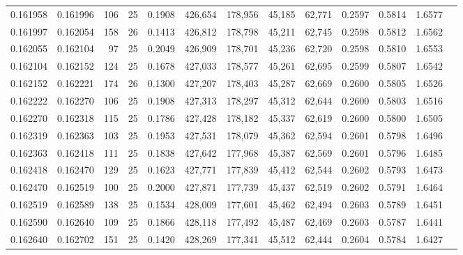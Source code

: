 \begin{tabular}{rrrrrrrrrrrrr}
0.161958 & 0.161996 &   106 &  25 &                                     0.1908 & 426,654 & 178,956 &  45,185 &  62,771 & 0.2597 & 0.5814 & 1.6577 \\
0.161997 & 0.162054 &   158 &  26 &                                     0.1413 & 426,812 & 178,798 &  45,211 &  62,745 & 0.2598 & 0.5812 & 1.6562 \\
0.162055 & 0.162104 &    97 &  25 &                                     0.2049 & 426,909 & 178,701 &  45,236 &  62,720 & 0.2598 & 0.5810 & 1.6553 \\
0.162104 & 0.162152 &   124 &  25 &                                     0.1678 & 427,033 & 178,577 &  45,261 &  62,695 & 0.2599 & 0.5807 & 1.6542 \\
0.162152 & 0.162221 &   174 &  26 &                                     0.1300 & 427,207 & 178,403 &  45,287 &  62,669 & 0.2600 & 0.5805 & 1.6526 \\
0.162222 & 0.162270 &   106 &  25 &                                     0.1908 & 427,313 & 178,297 &  45,312 &  62,644 & 0.2600 & 0.5803 & 1.6516 \\
0.162270 & 0.162318 &   115 &  25 &                                     0.1786 & 427,428 & 178,182 &  45,337 &  62,619 & 0.2600 & 0.5800 & 1.6505 \\
0.162319 & 0.162363 &   103 &  25 &                                     0.1953 & 427,531 & 178,079 &  45,362 &  62,594 & 0.2601 & 0.5798 & 1.6496 \\
0.162363 & 0.162418 &   111 &  25 &                                     0.1838 & 427,642 & 177,968 &  45,387 &  62,569 & 0.2601 & 0.5796 & 1.6485 \\
0.162418 & 0.162470 &   129 &  25 &                                     0.1623 & 427,771 & 177,839 &  45,412 &  62,544 & 0.2602 & 0.5793 & 1.6473 \\
0.162470 & 0.162519 &   100 &  25 &                                     0.2000 & 427,871 & 177,739 &  45,437 &  62,519 & 0.2602 & 0.5791 & 1.6464 \\
0.162519 & 0.162589 &   138 &  25 &                                     0.1534 & 428,009 & 177,601 &  45,462 &  62,494 & 0.2603 & 0.5789 & 1.6451 \\
0.162590 & 0.162640 &   109 &  25 &                                     0.1866 & 428,118 & 177,492 &  45,487 &  62,469 & 0.2603 & 0.5787 & 1.6441 \\
0.162640 & 0.162702 &   151 &  25 &                                     0.1420 & 428,269 & 177,341 &  45,512 &  62,444 & 0.2604 & 0.5784 & 1.6427 \\

\end{tabular}
